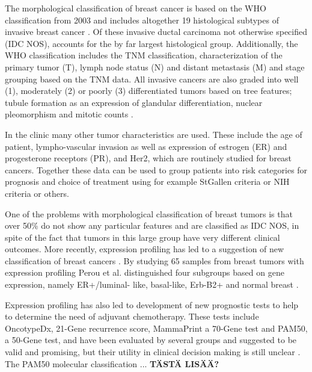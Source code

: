 The morphological classification of breast cancer is based
on the WHO classification from 2003 and includes altogether 19 histological
subtypes of invasive breast cancer \citep{Tavassoli2003,Weigelt2009}. Of these invasive ductal carcinoma
not otherwise specified (IDC NOS), accounts for the by far largest
histological group.  Additionally, the WHO classification includes the TNM
classification, characterization of the primary tumor (T), lymph node status
(N) and distant metastasis (M) and stage grouping based on the TNM data. All
invasive cancers are also graded into well (1), moderately (2) or poorly (3)
differentiated tumors based on  tree features; tubule formation as an
expression of glandular differentiation, nuclear pleomorphism and mitotic
counts \citep{Tavassoli2003}.

In the clinic many other tumor characteristics are used. These
include the age of patient, lympho-vascular invasion as well as expression of
estrogen (ER) and progesterone receptors (PR), and Her2, which are routinely
studied for breast cancers. Together these data can be used to group patients
into risk categories for prognosis and choice of treatment using for example
StGallen criteria \citep{Goldhirsch2007} or NIH criteria \citep{Eifel2001} or others.

One of the problems with morphological classification of breast tumors is that
over 50\% do not show any particular features and are classified as IDC NOS,
in spite of the fact that tumors in this large group have very different
clinical outcomes. More recently, expression profiling has led to a suggestion
of new classification of breast cancers \citep{Perou2000,Sorlie2001}. By studying 65
samples from breast tumors with expression profiling Perou et al.
distinguished four subgroups based on gene expression, namely ER+/luminal-
like, basal-like, Erb-B2+ and normal breast \citep{Perou2000}.

Expression profiling has also led to development of new prognostic tests to
help to determine the need of adjuvant chemotherapy.  These tests include
OncotypeDx, 21-Gene recurrence score, MammaPrint a 70-Gene test and PAM50, a
50-Gene test, and have been evaluated by several groups and suggested to be
valid and promising, but their utility in clinical decision making is still
unclear \citep{Azim2013}. The PAM50 molecular classification ... \textbf{TÄSTÄ LISÄÄ?}




